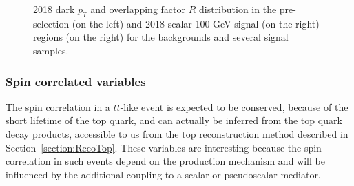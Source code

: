 \documentclass[a4paper, 10pt, openright]{report}
\begin{document}
\begin{figure}[htbp]
\caption{2018 dark $p_T$ and overlapping factor $R$ distribution in the pre-selection (on the left) and 2018 scalar 100 GeV signal (on the right) regions (on the right) for the backgrounds and several signal samples.}
\label{fig:SRdisc1}
\end{figure}

\subsubsection*{Spin correlated variables}

The spin correlation in a $t \bar t$-like event is expected to be conserved, because of the short lifetime of the top quark, and can actually be inferred from the top quark decay products, accessible to us from the top reconstruction method described in Section~\ref{section:RecoTop}. These variables are interesting because the spin correlation in such events depend on the production mechanism and will be influenced by the additional coupling to a scalar or pseudoscalar mediator.
\end{document}
